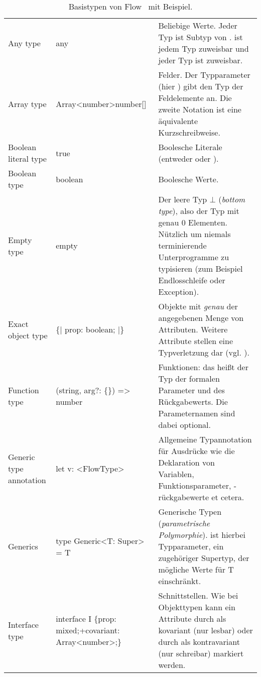 \begin{longtabuenv}
\begin{longtabu} to 
    \midrule
     &  &  \\
    \midrule
  \endhead
    \midrule
    \caption{Basistypen von Flow~\autocite{FLOW:TYPE_ANNOTATIONS} mit Beispiel.}
  \endfoot
  Any type                 & any                             & Beliebige Werte. Jeder Typ ist Subtyp von .  ist jedem Typ zuweisbar und jeder Typ ist  zuweisbar. \medskip\\
  Array type               & Array<number>\newline number[]  & Felder. Der Typparameter (hier ) gibt den Typ der Feldelemente an. Die zweite Notation ist eine äquivalente Kurzschreibweise.\medskip\\
  Boolean literal type     & true                            & Boolesche Literale (entweder  oder ). \medskip\\
  Boolean type             & boolean                         & Boolesche Werte. \medskip\\
  Empty type               & empty                           & Der leere Typ $\bot$ (\textit{bottom type}), also der Typ mit genau 0 Elementen. Nützlich um niemals terminierende Unterprogramme zu typisieren (zum Beispiel Endlosschleife oder Exception). \medskip\\
  Exact object type        & \{| prop: boolean; |\}          & Objekte mit \emph{genau} der angegebenen Menge von Attributen. Weitere Attribute stellen eine Typverletzung dar (vgl. ).\medskip\\
  Function type            & (string, arg?: \{\}) => number  & Funktionen: das heißt der Typ der formalen Parameter und des Rückgabewerts. Die Parameternamen sind dabei optional. \medskip\\
  Generic type annotation  & let v: <{}FlowType>{}           & Allgemeine Typannotation für Ausdrücke wie die Deklaration von Variablen, Funktionsparameter, -rückgabewerte et cetera. \medskip\\
  Generics                 & type Generic<{}T: Super> = T    & Generische Typen (\textit{parametrische Polymorphie}).  ist hierbei Typparameter,  ein zugehöriger Supertyp, der mögliche Werte für T einschränkt. \medskip\\
  Interface type           & interface I \{\newline\hspace*{1.25em}prop: mixed;\newline\hspace*{1.25em}+covariant: Array<number>;\newline\}\medskip & Schnittstellen. Wie bei Objekttypen kann ein Attribute durch \code{+} als kovariant (nur lesbar) oder durch \code{-} als kontravariant (nur schreibar) markiert werden. \medskip\\

\end{longtabu}
\end{longtabuenv}
